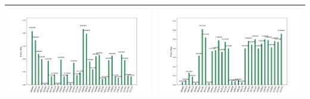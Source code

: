 \begin{landscape}
\begin{table}[ht]
\begin{tabular}{c c}
        \includegraphics[scale=0.32]{Grover_results/Grover_n=5,m=3.png} & \includegraphics[scale=0.32]{Grover_results/Grover_n=5,m=4.png} \\ \hline
    \end{tabular}
\end{table}
\end{landscape}

